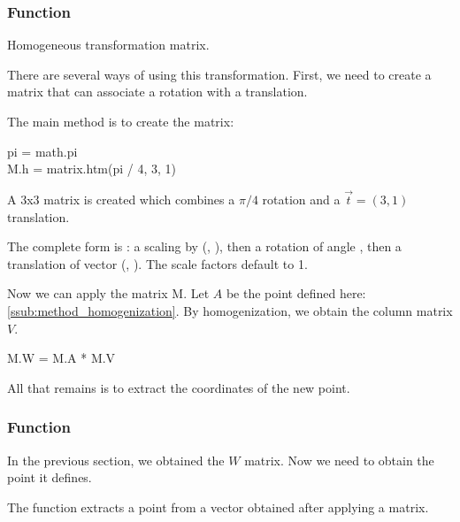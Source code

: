 \subsubsection{Function }
\label{ssub:method_htm}
Homogeneous transformation matrix.

There are several ways of using this transformation. First, we need to create a matrix that can associate a rotation with a translation.

The main method is to create the matrix:

\begin{mybox}
  pi  = math.pi\\
  M.h   = matrix.htm(pi / 4, 3, 1)
\end{mybox}

A 3x3 matrix is created which combines a $\pi/4$ rotation and a $\overrightarrow{t}=(3,1)$ translation.

The complete form is : a scaling by (, ), then a rotation of angle , then a translation of vector (, ). The scale factors default to 1.



Now we can apply the matrix M. Let $A$ be the point defined here: \ref{ssub:method_homogenization}. By homogenization, we obtain the column matrix $V$.


\begin{mybox}
M.W = M.A * M.V
\end{mybox}


All that remains is to extract the coordinates of the new point.

\subsubsection{Function }
\label{ssub:method_get_htm_point}

In the previous section, we obtained the $W$ matrix. Now we need to obtain the point it defines.

The function  extracts a point from a vector obtained after applying a  matrix.

